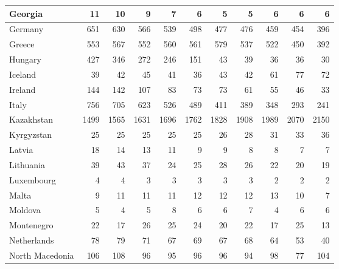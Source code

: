 \begin{table}
\begin{tabular}{|l|r|r|r|r|r|r|r|r|r|r|}
                       Georgia&     11&     10&      9&      7&      6&      5&      5&      6&      6&      6\\\hline
                       Germany&    651&    630&    566&    539&    498&    477&    476&    459&    454&    396\\\hline
                        Greece&    553&    567&    552&    560&    561&    579&    537&    522&    450&    392\\\hline
                       Hungary&    427&    346&    272&    246&    151&     43&     39&     36&     36&     30\\\hline
                       Iceland&     39&     42&     45&     41&     36&     43&     42&     61&     77&     72\\\hline
                       Ireland&    144&    142&    107&     83&     73&     73&     61&     55&     46&     33\\\hline
                         Italy&    756&    705&    623&    526&    489&    411&    389&    348&    293&    241\\\hline
                    Kazakhstan&   1499&   1565&   1631&   1696&   1762&   1828&   1908&   1989&   2070&   2150\\\hline
                    Kyrgyzstan&     25&     25&     25&     25&     25&     26&     28&     31&     33&     36\\\hline
                        Latvia&     18&     14&     13&     11&      9&      9&      8&      8&      7&      7\\\hline
                     Lithuania&     39&     43&     37&     24&     25&     28&     26&     22&     20&     19\\\hline
                    Luxembourg&      4&      4&      3&      3&      3&      3&      3&      2&      2&      2\\\hline
                         Malta&      9&     11&     11&     11&     12&     12&     12&     13&     10&      7\\\hline
                       Moldova&      5&      4&      5&      8&      6&      6&      7&      4&      6&      6\\\hline
                    Montenegro&     22&     17&     26&     25&     24&     20&     22&     17&     25&     13\\\hline
                   Netherlands&     78&     79&     71&     67&     69&     67&     68&     64&     53&     40\\\hline
               North Macedonia&    106&    108&     96&     95&     96&     96&     94&     98&     77&    104\\\hline

\end{tabular}
\end{table}
